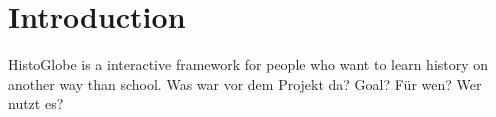 \section{Introduction}
HistoGlobe is a interactive framework for people who want to learn history on another way than school.
Was war vor dem Projekt da?
Goal?
Für wen?
Wer nutzt es?

